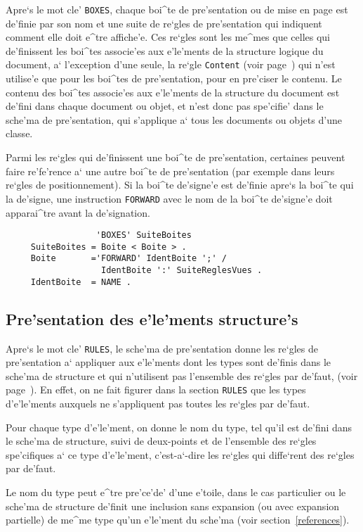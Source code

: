 {Apre`s le mot cle' {\tt BOXES}, chaque boi^te de pre'sentation ou de mise en page
est de'finie par son nom et une suite de re`gles de pre'sentation qui indiquent
comment elle doit e^tre affiche'e. Ces re`gles sont les me^mes que celles qui
de'finissent les boi^tes associe'es aux e'le'ments de la structure logique du
document, a` l'exception d'une seule, la re`gle {\tt Content} (voir
page~\pageref{content}) qui n'est utilise'e que pour les boi^tes de
pre'sentation, pour en pre'ciser le contenu. Le contenu des boi^tes associe'es
aux e'le'ments de la structure du document est de'fini dans chaque document
ou objet, et n'est donc pas spe'cifie' dans le sche'ma de pre'sentation, qui
s'applique a` tous les documents ou objets d'une classe.

Parmi les re`gles qui de'finissent une boi^te de pre'sentation, certaines
peuvent faire re'fe'rence a` une autre boi^te de pre'sentation (par exemple dans
leurs re`gles de positionnement). Si la boi^te de'signe'e est de'finie apre`s la
boi^te qui la de'signe, une instruction {\tt FORWARD} avec le nom de la
boi^te de'signe'e doit apparai^tre avant la de'signation.

\begin{verbatim}
                  'BOXES' SuiteBoites
     SuiteBoites = Boite < Boite > .
     Boite       ='FORWARD' IdentBoite ';' /
                   IdentBoite ':' SuiteReglesVues .
     IdentBoite  = NAME .
\end{verbatim}

\subsection{Pre'sentation des e'le'ments structure's}

Apre`s le mot cle' {\tt RULES}, le sche'ma de pre'sentation donne les re`gles
de pre'sentation a` appliquer aux e'le'ments dont les types sont de'finis dans
le sche'ma de structure et qui n'utilisent pas l'ensemble des re`gles par
de'faut, (voir page~\pageref{reglesdefaut}). En effet, on ne fait figurer
dans la section {\tt RULES} que les types d'e'le'ments auxquels ne
s'appliquent pas toutes les re`gles par de'faut.

Pour chaque type d'e'le'ment, on donne le nom du type, tel qu'il est de'fini
dans le sche'ma de structure, suivi de deux-points et de l'ensemble des re`gles
spe'cifiques a` ce type d'e'le'ment, c'est-a`-dire les re`gles qui diffe`rent
des re`gles par de'faut.

Le nom du type peut e^tre pre'ce'de' d'une e'toile, dans le cas particulier
ou le sche'ma de structure de'finit une inclusion sans expansion (ou avec
expansion partielle) de me^me
type qu'un e'le'ment du sche'ma (voir section~\ref{references}).

}
